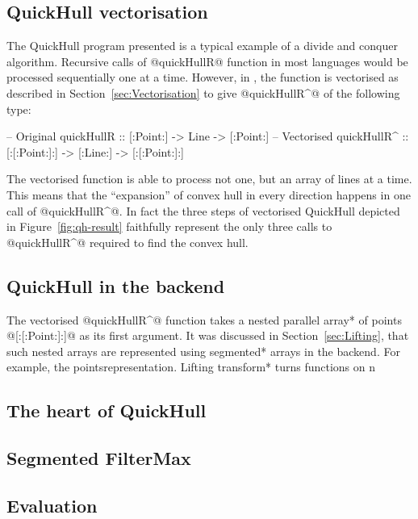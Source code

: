 \documentclass[preamble.tex]{subfiles}
\begin{document}
\subsection{QuickHull vectorisation}

The QuickHull program presented is a typical example of a divide and conquer algorithm. Recursive calls of @quickHullR@ function in most languages would be processed sequentially one at a time. However, in \DPH, the function is vectorised as described in Section~\ref{sec:Vectorisation} to give @quickHullR^@ of the following type:


\begin{hscode}[literate={^}{{$^\uparrow$}}1,]
-- Original
quickHullR  :: [:Point:] -> Line -> [:Point:]
-- Vectorised
quickHullR^ :: [:[:Point:]:] -> [:Line:] -> [:[:Point:]:]
\end{hscode}


The vectorised function is able to process not one, but an array of lines at a time. This means that the ``expansion'' of convex hull in every direction happens in one call of @quickHullR^@. In fact the three steps of vectorised QuickHull depicted in Figure~\ref{fig:qh-result} faithfully represent the only three calls to @quickHullR^@ required to find the convex hull.



\subsection{QuickHull in the backend}

The vectorised @quickHullR^@ function takes a \*nested parallel array* of points @[:[:Point:]:]@ as its first argument. It was discussed in Section~\ref{sec:Lifting}, that such nested arrays are represented using \*segmented* arrays in the backend. For example, the pointsrepresentation. \*Lifting transform* turns functions on n

\subsection{The heart of QuickHull}

\subsection{Segmented FilterMax}

\subsection{Evaluation}
\end{document}
